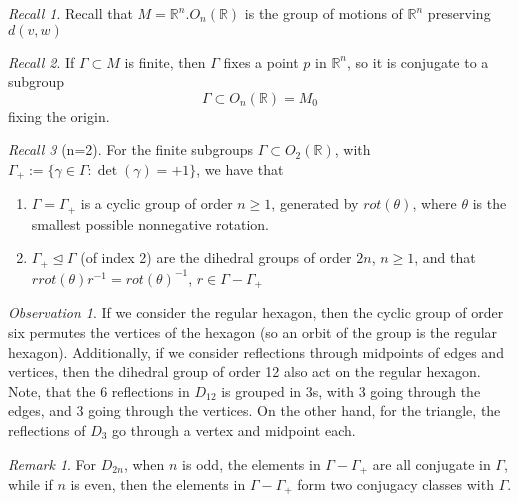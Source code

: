 \documentclass[12pt]{article}
\theoremstyle{definition}
\theoremstyle{remark}
\newtheorem{rmk}[thm]{Remark}
\newtheorem{obs}[thm]{Observation}
\newtheorem*{rec}{Recall}
\numberwithin{equation}{section}
\newcommand\R{\mathbb R}    %
\newcommand\nsub{\trianglelefteq}
\begin{document}
\begin{rec}
        Recall that $M = \R^n.O_n(\R)$ is the group of motions of $\R^n$ preserving $d(v,w)$
\end{rec}

\vspace{15pt}

\begin{rec}
        If $\Gamma \subset M$ is finite, then $\Gamma$ fixes a point $p$ in $\R^n$, so it is conjugate to a subgroup \begin{equation}
                \Gamma \subset O_n(\R) = M_0
        \end{equation}
        fixing the origin.
\end{rec}

\vspace{15pt}

\begin{rec}[n=2]
        For the finite subgroups $\Gamma \subset O_2(\R)$, with $\Gamma_+ := \{\gamma \in \Gamma: \det(\gamma) = +1\}$, we have that \begin{enumerate}
                \item $\Gamma = \Gamma_+$ is a cyclic group of order $n \geq 1$, generated by $rot(\theta)$, where $\theta$ is the smallest possible nonnegative rotation.
                \item $\Gamma_+ \nsub \Gamma$ (of index 2) are the dihedral groups of order $2n$, $n \geq 1$, and that $rrot(\theta)r^{-1} = rot(\theta)^{-1}$, $r \in \Gamma - \Gamma_+$
        \end{enumerate}
\end{rec}

\vspace{15pt}

\begin{obs}
        If we consider the regular hexagon, then the cyclic group of order six permutes the vertices of the hexagon (so an orbit of the group is the regular hexagon). Additionally, if we consider reflections through midpoints of edges and vertices, then the dihedral group of order 12 also act on the regular hexagon. Note, that the 6 reflections in $D_{12}$ is grouped in 3s, with 3 going through the edges, and 3 going through the vertices. On the other hand, for the triangle, the reflections of $D_3$ go through a vertex and midpoint each.
\end{obs}


\vspace{15pt}

\begin{rmk}
        For $D_{2n}$, when $n$ is odd, the elements in $\Gamma - \Gamma_+$ are all conjugate in $\Gamma$, while if $n$ is even, then the elements in $\Gamma-\Gamma_+$ form two conjugacy classes with $\Gamma$.
\end{rmk}
\end{document}
